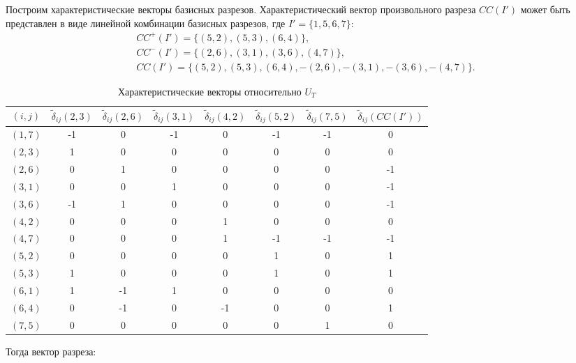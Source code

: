 \documentclass[a4paper,14pt,usenames,dvipsnames]{extreport}
\begin{document}
Построим характеристические векторы базисных разрезов. Характеристический вектор произвольного разреза $CC(I')$ может быть представлен в виде линейной комбинации базисных разрезов, где $I' = \{1, 5, 6, 7\}$:
\begin{gather*}
CC^+(I') = \{(5,2), (5,3), (6,4)\},\\
CC^-(I') = \{(2,6), (3,1), (3, 6), (4, 7)\},\\
CC(I') = \{(5,2), (5,3), (6,4), -(2,6), -(3,1), -(3, 6), -(4, 7)\}.
\end{gather*}
\begin{table}[H]
\renewcommand{\arraystretch}{1.3}
\caption{Характеристические векторы относительно $U_{T}$}
\label{tab:u3}
\begin{center}
\begin{tabular}{|c|c|c|c|c|c|c|c|}
\hline $(i, j)$ & $\tilde{\delta}_{i j}(2,3)$ & $\tilde{\delta}_{i j}(2,6)$ & $\tilde{\delta}_{i j}(3,1)$ & $\tilde{\delta}_{i j}(4,2)$ & $\tilde{\delta}_{i j}(5,2)$ & $\tilde{\delta}_{i j}(7,5)$ & $\tilde{\delta}_{i j}(CC(I'))$\\
\hline $(1,7)$ & -1 & 0 & -1 & 0 & -1 & -1 & 0 \\
\hline $(2,3)$ & 1 & 0 & 0 & 0 & 0 & 0 & 0 \\
\hline $(2,6)$ & 0 & 1 & 0 & 0 & 0 & 0 & -1 \\
\hline $(3,1)$ & 0 & 0 & 1 & 0 & 0 & 0 & -1 \\
\hline $(3,6)$ & -1 & 1 & 0 & 0 & 0 & 0 & -1 \\
\hline $(4,2)$ & 0 & 0 & 0 & 1 & 0 & 0 & 0 \\
\hline $(4,7)$ & 0 & 0 & 0 & 1 & -1 & -1 & -1 \\
\hline $(5,2)$ & 0 & 0 & 0 & 0 & 1 & 0 & 1 \\
\hline $(5,3)$ & 1 & 0 & 0 & 0 & 1 & 0 & 1 \\
\hline $(6,1)$ & 1 & -1 & 1 & 0 & 0 & 0 & 0 \\
\hline $(6,4)$ & 0 & -1 & 0 & -1 & 0 & 0 & 1 \\
\hline $(7,5)$ & 0 & 0 & 0 & 0 & 0 & 1 & 0 \\
\hline
\end{tabular}
\end{center}
\end{table}

Тогда вектор разреза:
\end{document}

